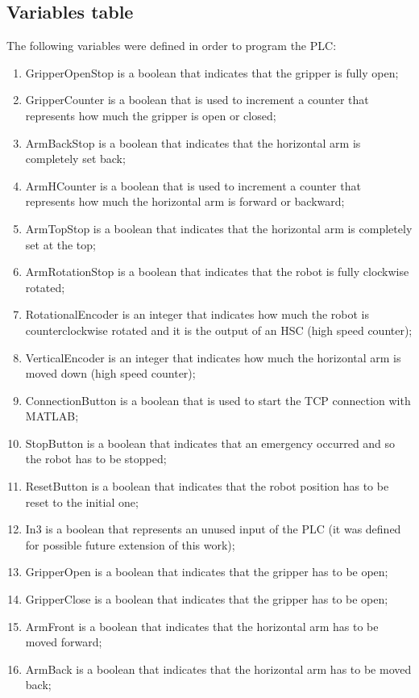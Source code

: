 \subsection{Variables table}
The following variables were defined in order to program the PLC:
\begin{enumerate}
    \item GripperOpenStop is a boolean that indicates that the gripper is fully open;
    \item GripperCounter is a boolean that is used to increment a counter that represents how much the gripper is open or closed;
    \item ArmBackStop is a boolean that indicates that the horizontal arm is completely set back;
    \item ArmHCounter is a boolean that is used to increment a counter that represents how much the horizontal arm is forward or backward;
    \item ArmTopStop is a boolean that indicates that the horizontal arm is completely set at the top;
    \item ArmRotationStop is a boolean that indicates that the robot is fully clockwise rotated;
    \item RotationalEncoder is an integer that indicates how much the robot is counterclockwise rotated and it is the output of an HSC (high speed counter);
    \item VerticalEncoder is an integer that indicates how much the horizontal arm is moved down (high speed counter);
    \item ConnectionButton is a boolean that is used to start the TCP connection with MATLAB;
    \item StopButton is a boolean that indicates that an emergency occurred and so the robot has to be stopped;
    \item ResetButton is a boolean that indicates that the robot position has to be reset to the initial one;
    \item In3 is a boolean that represents an unused input of the PLC (it was defined for possible future extension of this work);
    \item GripperOpen is a boolean that indicates that the gripper has to be open;
    \item GripperClose is a  boolean that indicates that the gripper has to be open;
    \item ArmFront is a boolean that indicates that the horizontal arm has to be moved forward;
    \item ArmBack is a boolean that indicates that the horizontal arm has to be moved back;

\end{enumerate}

